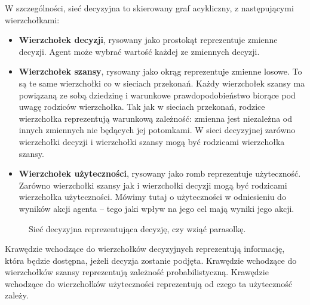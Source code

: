 \documentclass[a4paper, 12pt,oneside]{book}
\begin{document}
W szczególności, sieć decyzyjna to skierowany graf acykliczny, z następującymi
wierzchołkami:
\begin{itemize}
	\setlength\itemsep{-0.4em}
\item \textbf{Wierzchołek decyzji}, rysowany jako prostokąt reprezentuje
	zmienne decyzji. Agent może wybrać wartość każdej ze zmiennych decyzji.
\item \textbf{Wierzchołek szansy}, rysowany jako okrąg reprezentuje zmienne
	losowe. To są te same wierzchołki co w sieciach przekonań. Każdy
	wierzchołek szansy ma powiązaną ze sobą dziedzinę i warunkowe
	prawdopodobieństwo biorące pod uwagę rodziców wierzchołka. Tak jak w
	sieciach przekonań, rodzice wierzchołka reprezentują warunkową
	zależność: zmienna jest niezależna od innych zmiennych nie będących jej
	potomkami. W sieci decyzyjnej zarówno wierzchołki decyzji i wierzchołki
	szansy mogą być rodzicami wierzchołka szansy.
\item \textbf{Wierzchołek użyteczności}, rysowany jako romb reprezentuje
	użyteczność. Zarówno wierzchołki szansy jak i wierzchołki decyzji mogą
	być rodzicami wierzchołka użyteczności. Mówimy tutaj o użyteczności w
	odniesieniu do wyników akcji agenta -- tego jaki wpływ na jego cel mają
	wyniki jego akcji.
\end{itemize}
\begin{figure}[!htb]
\begin{center}
\caption{Sieć decyzyjna reprezentująca decyzję, czy wziąć parasolkę.}
\label{decision_network_umbrella}
\end{center}
\end{figure}
Krawędzie wchodzące do wierzchołków decyzyjnych reprezentują informację, która
będzie dostępna, jeżeli decyzja zostanie podjęta.
Krawędzie wchodzące do wierzchołków szansy reprezentują zależność
probabilistyczną.
Krawędzie wchodzące do wierzchołków użyteczności reprezentują od czego ta
użyteczność zależy.
\end{document}
